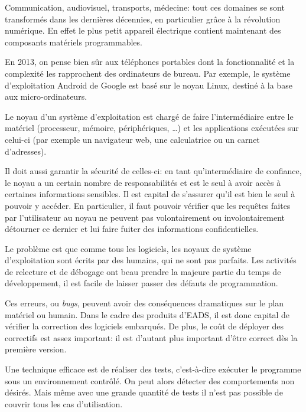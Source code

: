 Communication,
audiovisuel,
transports,
médecine:
tout ces domaines se sont transformés dans les dernières décennies,
en particulier grâce à la révolution numérique.
En effet le plus petit appareil électrique contient maintenant des composants
matériels programmables.

En 2013, on pense bien sûr aux téléphones portables dont la fonctionnalité et la
complexité les rapprochent des ordinateurs de bureau. Par exemple, le système
d'exploitation Android de Google est basé sur le noyau Linux, destiné à la base
aux micro-ordinateurs.

Le noyau d'un système d'exploitation est chargé de faire l'intermédiaire entre
le matériel (processeur, mémoire, périphériques, …) et les applications
exécutées sur celui-ci (par exemple un navigateur web, une calculatrice ou un
carnet d'adresses).

Il doit aussi garantir la sécurité de celles-ci: en tant qu'intermédiaire de
confiance, le noyau a un certain nombre de responsabilités et est le seul à
avoir accès à certaines informations sensibles. Il est capital de s'assurer
qu'il est bien le seul à pouvoir y accéder. En particulier, il faut pouvoir
vérifier que les requêtes faites par l'utilisateur au noyau ne peuvent pas
volontairement ou involontairement détourner ce dernier et lui faire fuiter des
informations confidentielles.

Le problème est que comme tous les logiciels, les noyaux de système
d'exploitation sont écrits par des humains, qui ne sont pas parfaits. Les
activités de relecture et de débogage ont beau prendre la majeure partie du
temps de développement, il est facile de laisser passer des défauts de
programmation.

Ces erreurs, ou \emph{bugs}, peuvent avoir des conséquences dramatiques sur le
plan matériel ou humain. Dans le cadre des produits d'EADS, il est donc capital
de vérifier la correction des logiciels embarqués. De plus, le coût de déployer
des correctifs est assez important: il est d'autant plus important d'être
correct dès la première version.



Une technique efficace est de réaliser des tests, c'est-à-dire exécuter le
programme sous un environnement contrôlé. On peut alors détecter des
comportements non désirés. Mais même avec une grande quantité de tests il n'est
pas possible de couvrir tous les cas d'utilisation.


